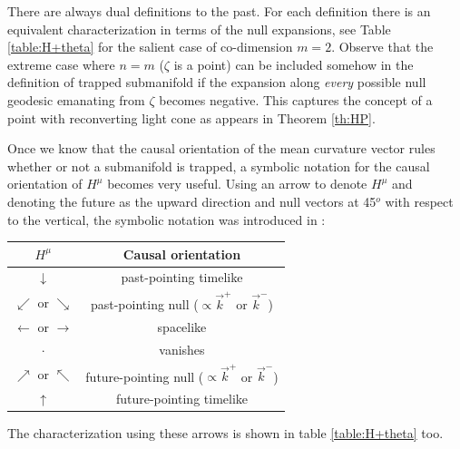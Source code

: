 \documentclass[12pt]{iopart}
\begin{document}
There are always dual definitions to the past. 
For each definition there is an equivalent characterization in terms of the null expansions, see Table \ref{table:H+theta} for the salient case of co-dimension $m=2$. Observe that the extreme case where $n=m$ ($\zeta$ is a point) can be  included  somehow in the definition of trapped submanifold if the expansion along {\em every} possible null geodesic emanating from $\zeta$ becomes negative. This captures the concept of a point with reconverting light cone as appears in Theorem \ref{th:HP}.



Once we know that the causal orientation of the mean curvature vector rules whether or not a submanifold is trapped, a symbolic notation for the causal orientation of $H^\mu$ becomes very useful. Using an arrow to denote $H^\mu$ and denoting the future as the upward direction and null vectors at 45$^o$ with respect to the vertical, the symbolic notation was introduced in \cite{S0}:
\begin{center}
\begin{tabular}{c|c}
$H^\mu$ & Causal orientation \\
\hline
$\downarrow$  & past-pointing timelike\\
$\swarrow$ or $\searrow$ & past-pointing null ($\propto \vec k^+$ or $\vec k^-$) \\
$\leftarrow$ or $\rightarrow$  & spacelike\\
$\cdot$ & vanishes \\
$\nearrow$ or $\nwarrow$ & future-pointing null ($\propto \vec k^+$ or $\vec k^-$)\\
$\uparrow$ &  future-pointing timelike\\
\end{tabular}
\end{center}
The characterization using these arrows is shown in table \ref{table:H+theta} too.
\end{document}
